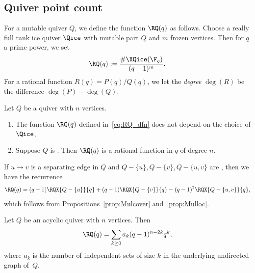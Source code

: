 \subsection{Quiver point count}
For a mutable quiver $Q$, we define the function $\RQ(q)$ as follows. Choose a really full rank ice quiver $\Qice$ with mutable part $Q$ and $m$ frozen vertices. Then for $q$ a prime power, we set
\begin{equation}\label{eq:RQ_dfn}
  \RQ(q):=\frac{\#\XQice(\F_q)}{(q-1)^m}.
\end{equation}
For a rational function $R(q)=P(q)/Q(q)$, we let the \emph{degree} $\deg(R)$ be the difference $\deg(P)-\deg(Q)$. 
\begin{proposition}\label{prop:Q_pcnt}
  Let $Q$ be a quiver with $n$ vertices.
  \begin{enumerate}
  \item The function $\RQ(q)$ defined in~\eqref{eq:RQ_dfn} does not depend on the choice of $\Qice$.
  \item Suppose $Q$ is \Louise. Then $\RQ(q)$ is a rational function in $q$ of degree $n$. %
  \end{enumerate}
\end{proposition}
If $u \to v$ is a separating edge in $Q$ and $Q-\{u\},Q-\{v\},Q-\{u,v\}$ are \Louise, then we have the recurrence
\begin{equation}\label{eq:RQ_recurrence}
  \RQ(q) = (q-1)\RQX{Q-\{u\}}{q}+ (q-1)\RQX{Q-\{v\}}{q}- (q-1)^2\RQX{Q-\{u,v\}}{q},
\end{equation}
which follows from Propositions~\ref{prop:Mulcover} and~\ref{prop:Mulloc}.

\begin{proposition}[{\cite[Proposition 3.9]{LS2}}] \label{prop:acycliccount}
Let $Q$ be an acyclic quiver with $n$ vertices.  Then 
$$
\RQ(q) = \sum_{k \geq 0} a_k (q-1)^{n-2k} q^k,
$$
where $a_k$ is the number of independent sets of size $k$ in the underlying undirected graph of~$Q$.
\end{proposition}

